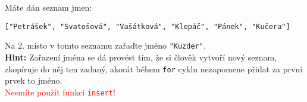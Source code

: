 \question[50]
Máte dán seznam jmen:
\begin{center}
	\texttt{["Petrášek", "Svatošová", "Vašátková", "Klepáč", "Pánek", "Kučera"]}
\end{center}
Na 2. místo v tomto seznamu zařaďte jméno \texttt{"Kuzder"}.\\
\textbf{Hint:} Zařazení jména se dá provést tím, že si člověk vytvoří nový
seznam, zkopíruje do něj ten zadaný, akorát během \texttt{for} cyklu nezapomene
přidat za první prvek to jméno.\\
\textcolor{red}{Nesmíte použít funkci \texttt{insert}!}